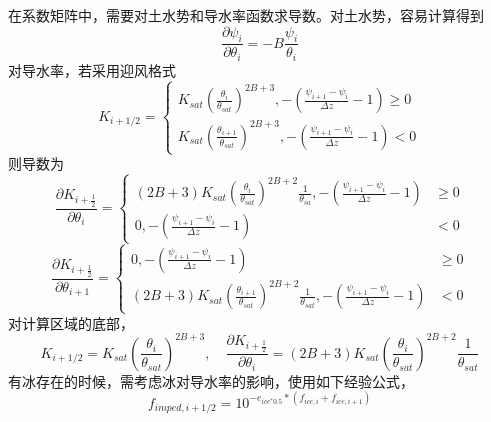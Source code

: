 在系数矩阵中，需要对土水势和导水率函数求导数。对土水势，容易计算得到
\begin{equation}
\frac{\partial \psi_{i}}{\partial \theta_{i}}=-B \frac{\psi_{i}}{\theta_{i}}
\end{equation}
对导水率，若采用迎风格式
\begin{equation}
    K_{i+1/2}=\left\{\begin{array}{l}K_{ {sat }}\left(\frac{\theta_{i}}{\theta_{ {sat }}}\right)^{2 B+3},
        -\left(\frac{\psi_{i+1}-\psi_{i}}{\Delta z}-1\right) \geq 0 \\ K_{ {sat }}\left(\frac{\theta_{i+1}}{\theta_{ {sat }}}\right)^{2 B+3},
        -\left(\frac{\psi_{i+1}-\psi_{i}}{\Delta z}-1\right)<0\end{array}\right.
\end{equation}
则导数为
\begin{equation}
\frac{\partial K_{i+\frac{1}{2}}}{\partial \theta_{i}}=\left\{\begin{aligned}(2 B+3) K_{ {sat }}\left(\frac{\theta_{i}}{\theta_{sat}}\right)^{2 B+2} 
    \frac{1}{\theta_{s a}},-\left(\frac{\psi_{i+1}-\psi_{i}}{\Delta z}-1\right) & \geq 0 \\ 0,-\left(\frac{\psi_{i+1}-\psi_{i}}{\Delta z}-1\right) &<0 \end{aligned}\right.
\end{equation}
\begin{equation}
\frac{\partial K_{i+\frac{1}{2}}}{\partial \theta_{i+1}}=\left\{\begin{aligned} 0,-\left(\frac{\psi_{i+1}-\psi_{i}}{\Delta z}-1\right) &
     \geq 0 \\(2 B+3) K_{ {sat }}\left(\frac{\theta_{i+1}}{\theta_{ {sat }}}\right)^{2 B+2} \frac{1}{\theta_{ {sat }}},-\left(\frac{\psi_{i+1}-\psi_{i}}{\Delta z}-1\right) &<0 \end{aligned}\right.
\end{equation}
对计算区域的底部，
\begin{equation}
K_{i+1 / 2}=K_{ {sat }}\left(\frac{\theta_{i}}{\theta_{ {sat }}}\right)^{2 B+3}, \quad \frac{\partial K_{i+\frac{1}{2}}}
{\partial \theta_{i}}=(2 B+3) K_{ {sat }}\left(\frac{\theta_{i}}{\theta_{ {sat }}}\right)^{2 B+2} \frac{1}{\theta_{sat}}
\end{equation}
有冰存在的时候，需考虑冰对导水率的影响，使用如下经验公式，
\begin{equation}
    {f}_{{imped}, {i}+1 / 2}=10^{-e_{i c e^{*} 0.5 }*\left(f_{i c e, i}+f_{i c e, i+1}\right)}
\end{equation}
